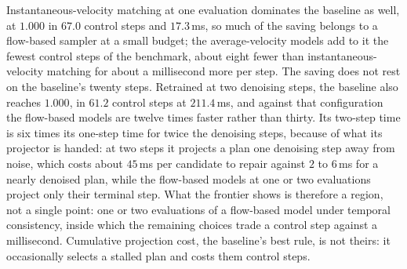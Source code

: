 Instantaneous-velocity matching at one evaluation dominates the baseline as well, at $1.000$ in $67.0$ control
steps and $17.3$\,ms, so much of the saving belongs to a flow-based sampler at a small budget; the
average-velocity models add to it the fewest control steps of the benchmark, about eight fewer than
instantaneous-velocity matching for about a millisecond more per step. The saving does not rest on the
baseline's twenty steps. Retrained at two denoising steps, the baseline also reaches $1.000$, in $61.2$
control steps at $211.4$\,ms, and against that configuration the flow-based models are twelve times faster
rather than thirty. Its two-step time is six times its one-step time for twice the denoising steps, because
of what its projector is handed: at two steps it projects a plan one denoising step away from noise, which costs about $45$\,ms per candidate to repair against $2$ to
$6$\,ms for a nearly denoised plan, while the flow-based models at one or two evaluations project only their
terminal step. What the frontier shows is therefore a region, not a single point: one or two evaluations of
a flow-based model under temporal consistency, inside which the remaining choices trade a control step
against a millisecond. Cumulative projection cost, the baseline's best rule, is not theirs: it occasionally
selects a stalled plan and costs them control steps.

